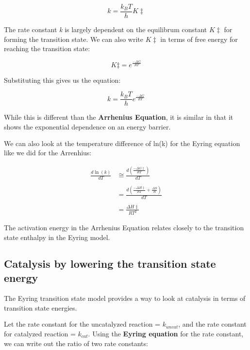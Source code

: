 \documentclass[12pt, letterpaper]{article}
\begin{document}
\begin{equation*}
    k = \frac{k_BT}{h}K\ddagger
\end{equation*}

The rate constant \emph{k} is largely dependent on the equilibrum constant $K\ddagger$ for forming
the transition state. We can also write $K\ddagger$ in terms of free energy for reaching the transition state: 

\begin{equation*}
    K\ddagger = e^{\frac{- \Delta G}{RT}}
\end{equation*}

Substituting this gives us the equation: 

\begin{equation}
    k = \frac{k_BT}{h}e^{\frac{- \Delta G}{RT}}
\end{equation}

While this is different than the \textbf{Arrhenius Equation}, it is similar in that 
it shows the exponential dependence on an energy barrier.

We can also look at the temperature difference of ln(k) for the Eyring equation like we did for the Arrenhius:

\begin{align*}
    \frac{d\ln(k)}{dT} &\cong \frac{d(\frac{- \Delta G \ddagger}{RT})}{dT} \\ \\ 
    &= \frac{d(\frac{- \Delta H \ddagger}{RT} + \frac{\Delta S}{R})}{dT} \\ \\
    &= \frac{\Delta H \ddagger}{RT^2}
\end{align*}

The activation energy in the Arrhenius Equation relates closely to the transition state enthalpy in the Eyring model. 
\newpage

\subsection*{Catalysis by lowering the transition state energy}

The Eyring transition state model provides a way to look at catalysis in terms of transition state energies.

Let the rate constant for the uncatalyzed reaction = $k_{uncat}$, and the rate constant for catalyzed reaction 
= $k_{cat}$. Using the \textbf{Eyring equation} for the rate constant, we can write out the ratio of two rate constants: 
\end{document}
